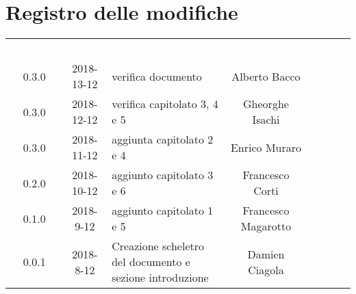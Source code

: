 
\section*{Registro delle modifiche}
{
	\renewcommand{\arraystretch}{1}
	\centering
	\begin{longtable}{| c| c | C{4cm} | c | c |}
		\textcolor{white}{\textbf{Versione}} & \textcolor{white}{\textbf{Data}} & \textcolor{white}{\textbf{Descrizione}} & \textcolor{white}{\textbf{Nominativo}} & \textcolor{white}{\textbf{Ruolo}}\\
		0.3.0 & 2018-13-12 & verifica documento & Alberto Bacco & \ver{} \\
		0.3.0 & 2018-12-12 & verifica capitolato 3, 4 e 5 & Gheorghe Isachi & \ver{}\\
		0.3.0 & 2018-11-12 &  aggiunta capitolato 2 e 4 & Enrico Muraro & \ana{}\\
		0.2.0 & 2018-10-12 & aggiunto capitolato 3 e 6 & Francesco Corti & \ana{}\\
		0.1.0 & 2018-9-12 & aggiunto capitolato 1 e 5 & Francesco Magarotto & \ana{} \\
		0.0.1 & 2018-8-12 & Creazione scheletro del documento e sezione introduzione & Damien Ciagola & \ana{}\\
	\end{longtable}

}